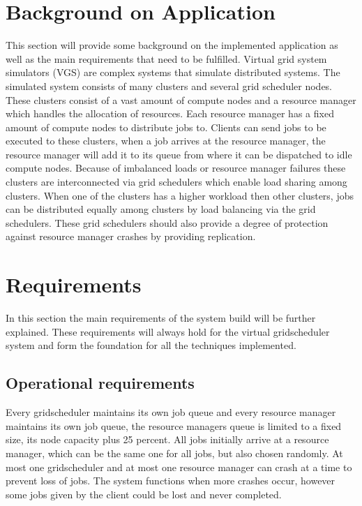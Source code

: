 \documentclass[a4paper]{article}
\begin{document}
\section{Background on Application}
This section will provide some background on the implemented application as well as the main requirements that need to be fulfilled. 
Virtual grid system simulators (VGS) are complex systems that simulate distributed systems. The simulated system consists of many clusters and several grid scheduler nodes. 
These clusters consist of a vast amount of compute nodes and a resource manager which handles the allocation of resources. 
Each resource manager has a fixed amount of compute nodes to distribute jobs to.
Clients can send jobs to be executed to these clusters, when a job arrives at the resource manager, the resource manager will add it to its queue from where it can be dispatched to idle compute nodes. 
Because of imbalanced loads or resource manager failures these clusters are interconnected via grid schedulers which enable load sharing among clusters. 
When one of the clusters has a higher workload then other clusters, jobs can be distributed equally among clusters by load balancing via the grid schedulers. 
These grid schedulers should also provide a degree of protection against resource manager crashes by providing replication.\\

\section{Requirements}
In this section the main requirements of the system build will be further explained.
These requirements will always hold for the virtual gridscheduler system and form the foundation for all the techniques implemented.

\subsection{Operational requirements}
Every gridscheduler maintains its own job queue and every resource manager maintains its own job queue, the resource managers queue is limited to a fixed size, its node capacity plus 25 percent.
All jobs initially arrive at a resource manager, which can be the same one for all jobs, but also chosen randomly.
At most one gridscheduler and at most one resource manager can crash at a time to prevent loss of jobs.
The system functions when more crashes occur, however some jobs given by the client could be lost and never completed.
\end{document}
